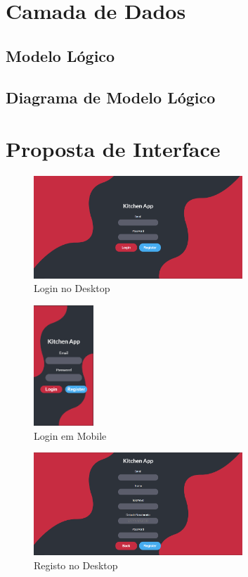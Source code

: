 \documentclass[a4paper]{report}
\begin{document}
\chapter{Camada de Dados}
    \section{Modelo Lógico}
    \section{Diagrama de Modelo Lógico}

\chapter{Proposta de Interface}
    \begin{figure}[H]
    \centering
            \includegraphics[width=0.7\textwidth]{images/mockup/login_desktop.png}
            \caption{Login no Desktop}
    \end{figure}
    \begin{figure}[H]
    \centering
            \includegraphics[width=0.2\textwidth]{images/mockup/login_mobile.png}
            \caption{Login em Mobile}
    \end{figure}
    \begin{figure}[H]
    \centering
            \includegraphics[width=0.7\textwidth]{images/mockup/register_desktop.png}
            \caption{Registo no Desktop}
    \end{figure}
\end{document}
